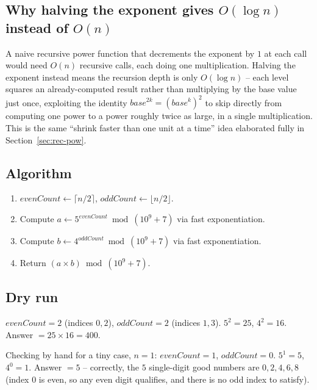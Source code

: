 \subsection*{Why halving the exponent gives $O(\log n)$ instead of $O(n)$}

A naive recursive power function that decrements the exponent by $1$ at
each call would need $O(n)$ recursive calls, each doing one
multiplication. Halving the exponent instead means the recursion depth is
only $O(\log n)$ -- each level squares an already-computed result rather
than multiplying by the base value just once, exploiting the identity
$\textit{base}^{2k} = (\textit{base}^k)^2$ to skip directly from
computing one power to a power roughly twice as large, in a single
multiplication. This is the same ``shrink faster than one unit at a
time'' idea elaborated fully in Section~\ref{sec:rec-pow}.

\subsection*{Algorithm}

\begin{enumerate}
  \item $\textit{evenCount} \gets \lceil n/2 \rceil$,
        $\textit{oddCount} \gets \lfloor n/2 \rfloor$.
  \item Compute $\textit{a} \gets 5^{\textit{evenCount}} \bmod
        (10^9+7)$ via fast exponentiation.
  \item Compute $\textit{b} \gets 4^{\textit{oddCount}} \bmod
        (10^9+7)$ via fast exponentiation.
  \item Return $(\textit{a} \times \textit{b}) \bmod (10^9+7)$.
\end{enumerate}

\subsection*{Dry run}


$\textit{evenCount}=2$ (indices $0,2$), $\textit{oddCount}=2$ (indices
$1,3$). $5^2=25$, $4^2=16$. Answer $=25\times16=400$.

Checking by hand for a tiny case, $n=1$: $\textit{evenCount}=1$,
$\textit{oddCount}=0$. $5^1=5$, $4^0=1$. Answer $=5$ -- correctly, the
$5$ single-digit good numbers are $0,2,4,6,8$ (index $0$ is even, so any
even digit qualifies, and there is no odd index to satisfy).

